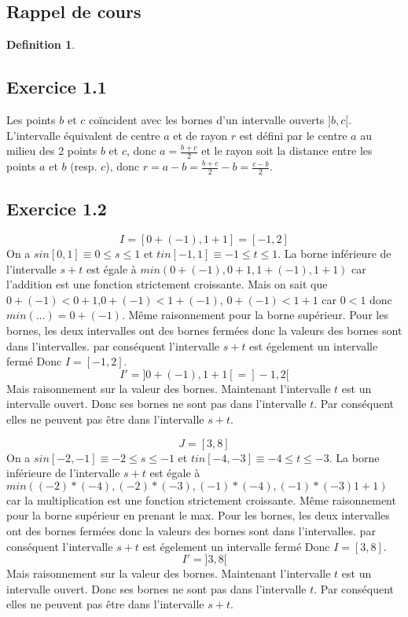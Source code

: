 \documentclass[]{book}
\theoremstyle{definition}
\newtheorem{defn}{Definition}
\begin{document}
\subsection*{Rappel de cours}

\begin{defn}
\end{defn}


\newpage
\subsection*{Exercice 1.1}



Les points $b$ et $c$ co\"incident avec les bornes d'un intervalle ouverts $]b,c[$. L'intervalle \'equivalent de centre $a$ et de rayon $r$ est d\'efini par  le centre $a$ au milieu des 2 points $b$ et $c$, donc $a = \frac{b+c}{2}$ et le rayon soit la distance entre les points $a$ et $b$ (resp. $c$), donc $r=a-b=\frac{b+c}{2}-b = \frac{c-b}{2}$. 


\subsection*{Exercice 1.2}
$$I=[0+(-1),1+1] = [-1,2]$$
On a $s in [0,1] \equiv 0 \leq s \leq 1$ et $t in [-1,1] \equiv -1 \leq t \leq 1$. La borne inf\'erieure de l'intervalle $s+t$ est \'egale \`a $min(0+(-1), 0+1, 1+(-1), 1+1)$ car l'addition est une fonction strictement croissante. Mais on sait que $0+(-1)<0+1$,$0+(-1)<1+(-1)$, $0+(-1)<1+1$ car $0<1$ donc $min(\ldots) = 0+(-1)$. M\^eme raisonnement pour la borne sup\'erieur. Pour les bornes, les deux intervalles ont des bornes ferm\'ees donc la valeurs des bornes sont dans l'intervalles. par cons\'equent l'intervalle $s+t$ est \'egelement un intervalle ferm\'e Donc $I = [-1,2]$.    
$$I'=]0+(-1),1+1[ = ]-1,2[$$
Mais raisonnement sur la valeur des bornes. Maintenant l'intervalle $t$ est un intervalle ouvert. Donc ses bornes ne sont pas dans l'intervalle $t$. Par cons\'equent elles ne peuvent pas \^etre dans l'intervalle $s+t$. 

$$J=[3,8]$$
On a $s in [-2,-1] \equiv -2 \leq s \leq -1$ et $t in [-4,-3] \equiv -4 \leq t \leq -3$. La borne inf\'erieure de l'intervalle $s+t$ est \'egale \`a $min((-2)*(-4), (-2)*(-3), (-1)*(-4), (-1)*(-3)1+1)$ car la multiplication est une fonction strictement croissante. M\^eme raisonnement pour la borne sup\'erieur en prenant le max. Pour les bornes, les deux intervalles ont des bornes ferm\'ees donc la valeurs des bornes sont dans l'intervalles. par cons\'equent l'intervalle $s+t$ est \'egelement un intervalle ferm\'e Donc $I = [3,8]$.    
$$I'= ]3,8[$$
Mais raisonnement sur la valeur des bornes. Maintenant l'intervalle $t$ est un intervalle ouvert. Donc ses bornes ne sont pas dans l'intervalle $t$. Par cons\'equent elles ne peuvent pas \^etre dans l'intervalle $s+t$. 
\end{document}
